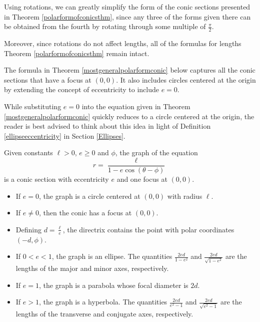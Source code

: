 \documentclass{ximera}
\begin{document}
Using rotations, we can greatly simplify the form of the conic sections presented in Theorem \ref{polarformofconicsthm}, since any three of the forms given there can be obtained from the fourth by rotating through some multiple of $\frac{\pi}{2}$.  

 

Moreover, since rotations do not affect lengths, all of the formulas for lengths Theorem \ref{polarformofconicsthm} remain intact. 

 

The formula in Theorem \ref{mostgeneralpolarformconic} below captures all the conic sections that have a focus at $(0,0)$.  It also includes circles centered at the origin by extending the concept of eccentricity to include $e=0$.  

 

While substituting $e=0$ into the equation given in Theorem \ref{mostgeneralpolarformconic} quickly reduces to a circle centered at the origin, the reader is best advised to think about this idea in light of Definition \ref{ellipseeccentricity} in Section \ref{Ellipses}.

 



 
\begin{theorem} \label{mostgeneralpolarformconic}  Given constants $\ell > 0$, $e \geq 0$ and $\phi$, the graph of the equation \[ r = \frac{\ell}{1 - e\cos(\theta - \phi)}\] is a conic section with eccentricity $e$ and one focus at $(0,0)$.

\begin{itemize}

\item  If $e = 0$, the graph is a circle centered at $(0,0)$ with radius $\ell$.

\item  If $e \neq 0$, then the conic has a focus at $(0,0)$. 

\item Defining $d = \frac{\ell}{e}$, the directrix contains the point with polar coordinates $(-d,\phi)$.

\item If $0 < e < 1$, the graph is an ellipse.   The quantities $\frac{2ed}{1-e^2}$ and  $\frac{2ed}{\sqrt{1-e^2}}$ are the lengths of the major and minor axes, respectively.

\item   If $e = 1$, the graph is a parabola whose focal diameter is $2d$.

\item  If $e > 1$, the graph is a hyperbola.  The quantities    $\frac{2ed}{e^2-1}$ and $\frac{2ed}{\sqrt{e^2-1}}$ are the lengths of the transverse and conjugate axes, respectively.



\end{itemize} 

 

\end{theorem}



\closegraphsfile
\end{document}

